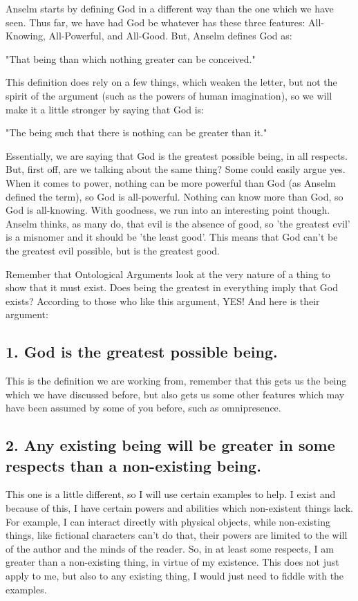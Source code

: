 Anselm starts by defining God in a different way than the one which we have seen. Thus far, we have had God be whatever has these three features: All-Knowing, All-Powerful, and All-Good. But, Anselm defines God as:
\begin{center}
"That being than which nothing greater can be conceived."
\end{center}
This definition does rely on a few things, which weaken the letter, but not the spirit of the argument (such as the powers of human imagination), so we will make it a little stronger by saying that God is:
\begin{center}
"The being such that there is nothing can be greater than it."
\end{center}
Essentially, we are saying that God is the greatest possible being, in all respects. But, first off, are we talking about the same thing? Some could easily argue yes. When it comes to power, nothing can be more powerful than God (as Anselm defined the term), so God is all-powerful. Nothing can know more than God, so God is all-knowing. With goodness, we run into an interesting point though. Anselm thinks, as many do, that evil is the absence of good, so 'the greatest evil' is a misnomer and it should be 'the least good'. This means that God can't be the greatest evil possible, but is the greatest good.  

Remember that Ontological Arguments look at the very nature of a thing to show that it must exist. Does being the greatest in everything imply that God exists? According to those who like this argument, YES! And here is their argument:

\subsection{1. God is the greatest possible being.}

This is the definition we are working from, remember that this gets us the being which we have discussed before, but also gets us some other features which may have been assumed by some of you before, such as omnipresence. 

\subsection{2. Any existing being will be greater in some respects than a non-existing being.}

This one is a little different, so I will use certain examples to help. I exist and because of this, I have certain powers and abilities which non-existent things lack. For example, I can interact directly with physical objects, while non-existing things, like fictional characters can't do that, their powers are limited to the will of the author and the minds of the reader. So, in at least some respects, I am greater than a non-existing thing, in virtue of my existence. This does not just apply to me, but also to any existing thing, I would just need to fiddle with the examples. 

